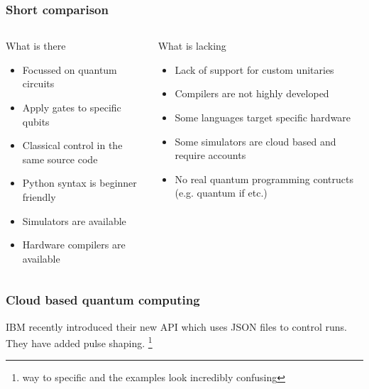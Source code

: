 \documentclass{beamer}
\begin{document}
\begin{frame}
\frametitle{Short comparison}
\begin{columns}
    \begin{block}{What is there}
    \begin{itemize}
        \item Focussed on quantum circuits
        \item Apply gates to specific qubits
        \item Classical control in the same source code
        \item Python syntax is beginner friendly
        \item Simulators are available
        \item Hardware compilers are available
    \end{itemize}
    \end{block}
    \begin{block}{What is lacking}
        \begin{itemize}
            \item Lack of support for custom unitaries
            \item Compilers are not highly developed
            \item Some languages target specific hardware
            \item Some simulators are cloud based and require accounts
            \item No real quantum programming contructs (e.g. quantum if etc.)
        \end{itemize}
        \end{block}
\end{columns}
\end{frame}

\begin{frame}
    \frametitle{Cloud based quantum computing}
    IBM recently introduced their new API \cite{mckay2018qiskit} which uses JSON files to control runs. They have
added pulse shaping. \footnote{way to specific and the examples look incredibly confusing} 

\end{frame}
\end{document}
